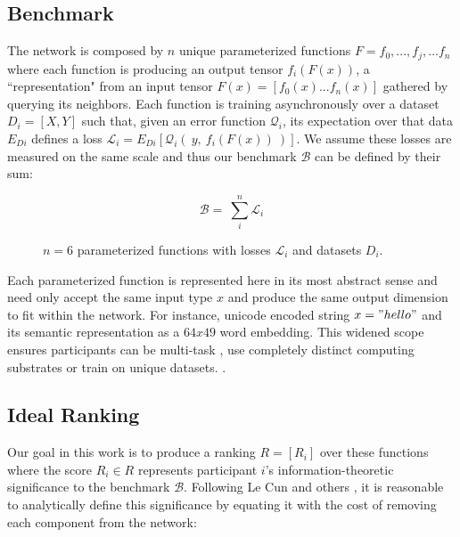 \documentclass{article}
\begin{document}
\subsection{Benchmark}

The network is composed by $n$ unique parameterized functions $F = {f_0, ...,  f_j, ...f_n}$ where each function is producing an output tensor $f_i(F(x))$, a ``representation" from an input tensor $F(x) = [f_0{(x)} ... f_n{(x)}]$ gathered by querying its neighbors. Each function is training asynchronously over a dataset $D_i=[X,Y]$ such that, given an error function $\mathcal{Q}_i$, its expectation over that data $E_{Di}$ defines a loss $\mathcal{L}_i = E_{Di}[\mathcal{Q}_i( \ y, \ f_i(F(x)) \ )]$. We assume these losses are measured on the same scale and thus our benchmark $\mathcal{B}$ can be defined by their sum:
\bigskip

\begin{equation}
\mathcal{B} = \ \sum_{i}^{n} \mathcal{L}_i 
\end{equation}

\begin{figure}[H]
	\centering
	\hspace*{-2cm}
	
	\caption{$n=6$ parameterized functions with losses $\mathcal{L}_i$ and datasets $D_i$.}
\end{figure}{}

Each parameterized function is represented here in its most abstract sense\cite{hinton2015distilling} and need only accept the same input type $x$ and produce the same output dimension to fit within the network. {\color{blue} For instance, unicode encoded string $x = "hello"$ and its semantic representation as a $64x49$ word embedding.} This widened scope ensures participants can be multi-task \cite{kaiser2017model}, use completely distinct computing substrates \cite{alex2014cortical} or train on unique datasets. \cite{lample2019crosslingual}. 

\subsection{Ideal Ranking}

Our goal in this work is to produce a ranking $R = [R_i]$ over these functions where the score $R_i \in R$ represents participant $i$'s information-theoretic significance to the benchmark $\mathcal{B}$. Following Le Cun and others \cite{lecun1989optimalbraindamage,yu2017nisp}, it is reasonable to analytically define this significance by equating it with the cost of removing each component from the network:
\bigskip
\end{document}
